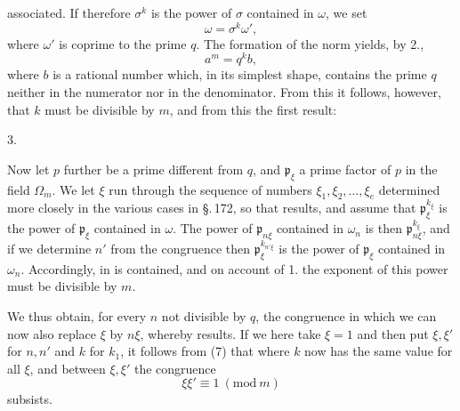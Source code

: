 associated. If therefore $\sigma^k$ is the power of $\sigma$ contained in $\omega$, we set
\[
\omega = \sigma^k \omega',
\]
where $\omega'$ is coprime to the prime $q$. The formation of the norm yields, by 2.,
\[
a^m = q^k b,
\]
where $b$ is a rational number which, in its simplest shape, contains the prime $q$ neither in the numerator nor in the denominator. From this it follows, however, that $k$ must be divisible by $m$, and from this the first result:

3. 

Now let $p$ further be a prime different from $q$, and $\mathfrak{p}_\xi$ a prime factor of $p$ in the field $\Omega_m$. We let $\xi$ run through the sequence of numbers $\xi_1, \xi_2, \ldots, \xi_e$ determined more closely in the various cases in \S.\,172, so that
results, and assume that $\mathfrak{p}_\xi^{k_\xi}$ is the power of $\mathfrak{p}_\xi$ contained in $\omega$. The power of $\mathfrak{p}_{n\xi}$ contained in $\omega_n$ is then $\mathfrak{p}_{n\xi}^{k_\xi}$, and if we determine $n'$ from the congruence
then $\mathfrak{p}_\xi^{k_{n'\xi}}$ is the power of $\mathfrak{p}_\xi$ contained in $\omega_n$. Accordingly, in
is contained, and on account of 1. the exponent of this power must be divisible by $m$.

We thus obtain, for every $n$ not divisible by $q$, the congruence
in which we can now also replace $\xi$ by $n\xi$, whereby
results. If we here take $\xi = 1$ and then put $\xi, \xi'$ for $n, n'$ and $k$ for $k_1$, it follows from (7) that
where $k$ now has the same value for all $\xi$, and between $\xi, \xi'$ the congruence
\[
\xi \xi' \equiv 1 \ (\mathrm{mod}\ m)
\]
subsists.
